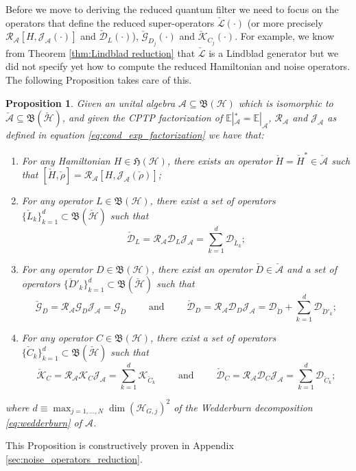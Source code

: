 \documentclass[aihp,12pt]{imsart}
\newcommand{\Dc}{\mathcal{D}}
\newcommand{\Gc}{\mathcal{G}}
\newcommand{\Hc}{\mathcal{H}}
\newcommand{\Jc}{\mathcal{J}}
\newcommand{\Rc}{\mathcal{R}}
\newcommand{\Kc}{\mathcal{K}}
\newcommand{\Lc}{\mathcal{L}}
\newcommand{\As}{\mathscr{A}}
\newcommand{\Eb}{\mathbb{E}}
\newcommand{\Bf}{\mathfrak{B}}
\newcommand{\Hf}{\mathfrak{H}}
\newcommand{\CE}{\mathbb{E}|}
\theoremstyle{theorem}
\newtheorem{proposition}{Proposition}
\theoremstyle{definition}
\theoremstyle{remark}
\begin{document}
Before we move to deriving the reduced quantum filter we need to focus on the operators that define the reduced super-operators $\check{\Lc}(\cdot)$ (or more precisely $\Rc_\As[H,\Jc_\As(\cdot)]$  and $\check{\Dc}_L(\cdot)$), $\check{\Gc}_{D_j}(\cdot)$ and $\check{\Kc}_{C_j}(\cdot)$. For example, we know from Theorem \ref{thm:Lindblad reduction} that $\check{\Lc}$ is a Lindblad generator but we did not specify yet how to compute the reduced Hamiltonian and noise operators. The following Proposition takes care of this.
\begin{proposition}
\label{prop:operator_reduction}
    Given an unital algebra $\As\subseteq\Bf(\Hc)$ which is isomorphic to $\check{\As}\subseteq\Bf(\check{\Hc})$, and given the CPTP factorization of $\CE_\mathscr{A}^* = \Eb|_\As$, $\Rc_\As$ and $\Jc_\As$ as defined in equation \eqref{eq:cond_exp_factorization} we have that:
    \begin{enumerate}
        \item For any Hamiltonian $H\in\Hf(\Hc)$, there exists an operator $\check{H} = \check{H}^*\in\check{\As}$ such that $[\check{H},\check{\rho}] = \Rc_\As [H,\Jc_\As(\check{\rho})]$;
        \item For any operator $L\in\Bf(\Hc)$, there exist a set of operators $\{\check{L}_k\}_{k=1}^d\subset\Bf(\check{\Hc})$ such that       
        \[\check{\Dc}_{L} = \Rc_{\As} \Dc_{L} \Jc_\As = \sum_{k=1}^d \Dc_{\check{L}_k}; \]
        \item For any operator $D\in\Bf(\Hc)$, there exist an operator $\check{D}\in\check{\As}$ and a set of operators $\{\check{D}'_k\}_{k=1}^d\subset \Bf(\check{\Hc})$ such that \[\check{\Gc}_{D} = \Rc_\As \Gc_D \Jc_{\As} = \Gc_{\check{D}} \qquad\text{ and }\qquad \check{\Dc}_{D} = \Rc_{\As} \Dc_{D} \Jc_\As = \Dc_{\check{D}} + \sum_{k=1}^d \Dc_{\check{D}'_k};\]
        \item For any operator $C\in\Bf(\Hc)$, there exist a set of operators $\{\check{C}_k\}_{k=1}^d\subset \Bf(\check{\Hc})$ such that \[ \check{\Kc}_{C} = \Rc_\As \Kc_C \Jc_{\As} = \sum_{k=1}^d \Kc_{\check{C}_k} \qquad\text{ and }\qquad \check{\Dc}_{C} = \Rc_{\As} \Dc_{C} \Jc_\As = \sum_{k=1}^d \Dc_{\check{C}_k};\]
    \end{enumerate}
   where $d\equiv\max_{j=1,\dots,N} \dim(\Hc_{G,j})^2$ of the Wedderburn decomposition \eqref{eq:wedderburn} of $\As$.
\end{proposition}
This Proposition is constructively proven in Appendix \ref{sec:noise_operators_reduction}. 
\end{document}
